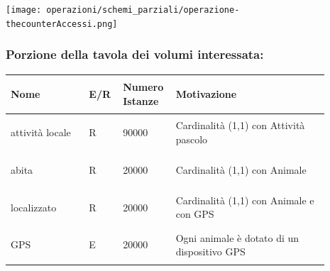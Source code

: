 \documentclass[12pt,a4paper]{article}
\begin{document}
\texttt{[image: operazioni/schemi\_parziali/operazione-\\thecounterAccessi.png]} 
\subsubsection*{Porzione della tavola dei volumi interessata:}
\begin{center}\setlength{\extrarowheight}{1.5pt}\begin{longtable}{|p{0.23\linewidth}|p{0.1\linewidth}|p{0.11\linewidth}|p{0.45\linewidth}|}
\hline \textbf{Nome}   & \begin{center}\vspace{-15pt}\textbf{E/R}\end{center} & \textbf{Numero Istanze} & \textbf{Motivazione}\\ 
\hline
attività locale 				& \begin{center}
\vspace{-25pt}R
\end{center}
					& \begin{center}
					\vspace{-25pt}90000\end{center}
					&  Cardinalità (1,1) con Attività pascolo \\ 

\hline
abita 				& \begin{center}
\vspace{-25pt}R
\end{center}
					& \begin{center}
					\vspace{-25pt}20000\end{center}
					&  Cardinalità (1,1) con Animale \\ 

\hline
localizzato 				& \begin{center}
\vspace{-25pt}R
\end{center}
					& \begin{center}
					\vspace{-25pt}20000\end{center}
					&  Cardinalità (1,1) con Animale e con GPS \\ 

\hline
GPS 				& \begin{center}
\vspace{-25pt}E
\end{center}
					& \begin{center}
					\vspace{-25pt}20000\end{center}
					&  Ogni animale è dotato di un dispositivo GPS \\ 


\end{longtable}
\end{center}
\end{document}
